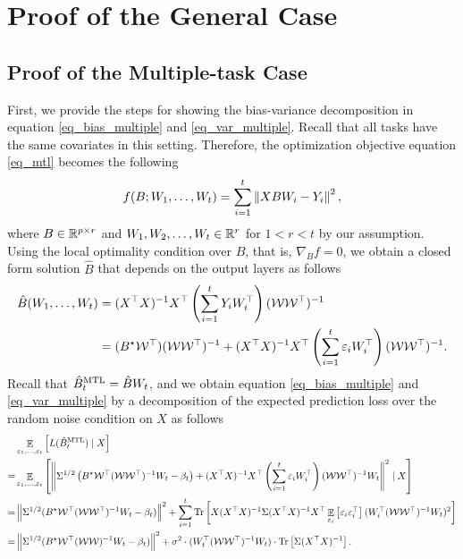 \section{Proof of the General Case}\label{sec_proof_general}



\subsection{Proof of the Multiple-task Case}\label{app_proof_many_tasks}

	First, we provide the steps for showing the bias-variance decomposition in equation \eqref{eq_bias_multiple} and \eqref{eq_var_multiple}.
	Recall that all tasks have the same covariates in this setting.
	Therefore, the optimization objective equation \eqref{eq_mtl} becomes the following
	\begin{align}
		f(B; W_1, \dots, W_t) = \sum_{i=1}^t \left\| X B W_i - Y_i \right\|^2, \label{eq_mtl_same_cov}
	\end{align}
	where $B \in \mathbb{R}^{p \times r}$ and $W_1, W_2, \dots, W_t \in \mathbb{R}^r$ for $1 < r < t$ by our assumption.
	Using the local optimality condition over $B$, that is, $\nabla_B f = 0$, we obtain a closed form solution $\hat{B}$ that depends on the output layers as follows
	\begin{align*}
		\hat{B}(W_1, \dots, W_t) &= (X^{\top}X)^{-1} X^{\top} \left({\sum_{i=1}^t Y_i W_i^{\top}}\right) (\mathcal W  \mathcal W^{\top})^{-1} \\
		&= (B^\star \mathcal W ^{\top}) (\mathcal W \mathcal W ^{\top})^{-1} + (X^{\top}X)^{-1}X^{\top}   \left({\sum_{i=1}^t \varepsilon_i W_i^{\top}}\right) (\mathcal W \mathcal W^{\top})^{-1}.
	\end{align*}
	Recall that $\hat{B}_t^{\textup{MTL}} = \hat{B} W_t$, and we obtain equation \eqref{eq_bias_multiple} and \eqref{eq_var_multiple} by a decomposition of the expected prediction loss over the random noise condition on $X$ as follows
	\begin{align}
		 & \mathop{\mathbb{E}}_{\varepsilon_1, \dots, \varepsilon_t}\left[ L(\hat{B}_t^{\textup{MTL}}) \mid X \right] \nonumber \\
		=& \mathop{\mathbb{E}}_{\varepsilon_1, \dots, \varepsilon_t}\left[ \left\| \Sigma^{1/2} \left({B^{\star} {\mathcal W}^{\top} ({\mathcal W} {\mathcal W}^{\top})^{-1}W_t - \beta_t}\right) + (X^{\top}X)^{-1} X^{\top} \left({\sum_{i=1}^t \varepsilon_i W_i^{\top}}\right) ({\mathcal W} {\mathcal W}^{\top})^{-1} W_t \right\|^2 \mid X \right] \nonumber \\
		=& \left\| \Sigma^{1/2} (B^{\star} {\mathcal W}^{\top} ({\mathcal W} {\mathcal W}^{\top})^{-1} W_t - \beta_t) \right\|^2
		+ \sum_{i=1}^t \operatorname{Tr}\left[X (X^{\top}X)^{-1}\Sigma (X^{\top}X)^{-1}X^{\top} \mathop{\mathbb{E}}_{\varepsilon_i}\left[ \varepsilon_i \varepsilon_i^{\top} \right] (W_i^{\top} ({\mathcal W} {\mathcal W}^{\top})^{-1} W_t)^2\right] \nonumber \\
		=& \left\| \Sigma^{1/2}(B^{\star} {\mathcal W}^{\top} ({\mathcal W} {\mathcal W})^{-1} W_t - \beta_t) \right\|^2
		+ \sigma^2 \cdot (W_t^{\top} ({\mathcal W} {\mathcal W}^{\top})^{-1} W_t) \cdot \operatorname{Tr}\left[\Sigma (X^{\top}X)^{-1}\right]. \label{eq_ex_pred}
	\end{align}
